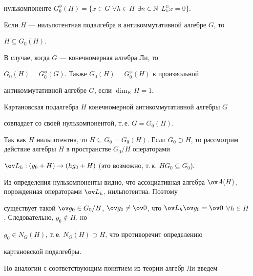 нулькомпоненте $G^\phi_0(H)=\{x\in G$ $\forall h\in H$ $\exists 


n\in\Bbb N$ $L^n_h x=0\}$.  


 


Если $H$ --- нильпотентная подалгебра в антикоммутативной алгебре $G$, то 


$H\subseteq G_0(H)$. 


 


В случае, когда $G$ --- конечномерная алгебра Ли, то 


$G_0(H)=G^\phi_0(G)$. Также $G_0(H)=G^\phi_0(H)$ в произвольной 


антикоммутативной алгебре $G$, если $\dim_K H=1$.  


 


 


\begin{prop} 


Картановская подалгебра $H$ конечномерной антикоммутативной алгебры $G$ 


совпадает со своей нулъкомпонентой, т.\,е. $G=G_0(H)$.  


\end{prop} 


 


Так как $H$ нильпотентна, то $H\subseteq G_0=G_0(H)$. Если $G_0\supset 


H$, то рассмотрим действие алгебры $H$ в пространстве $G_0/H$ операторами 


$\ov L_h:(g_0+H)\to(hg_0+H)$ (это возможно, т.\,к. $HG_0\subseteq G_0$). 


Из определения нулькомпоненты видно, что ассоциативная алгебра $\ov 


A(H)$, порожденная операторами $\ov L_h$, нильпотентна. Поэтому 


существует такой $\ov g_0\in G_0/H$, $\ov g_0\ne\ov 0$, что $\ov L_h 


\ov g_0=\ov 0$ $\forall h\in H$. Следовательно, $g_0\notin H$, но 


$g_0\in N_G(H)$, т.\,е. $N_G(H)\supset H$, что противоречит определению 


картановской подалгебры.  


 


По аналогии с соответствующим понятием из теории алгебр Ли введем  


